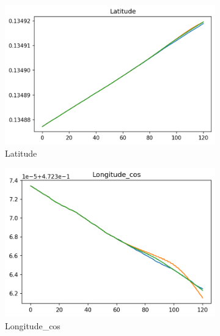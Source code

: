 \begin{figure}[ht]
     \centering
     \begin{subfigure}[b]{0.32\textwidth}
         \centering
         \includegraphics[width=\textwidth]{figures/prediction-plots-joint/Latitude.png}
         \caption{Latitude}
     \end{subfigure}
     \begin{subfigure}[b]{0.32\textwidth}
         \centering
         \includegraphics[width=\textwidth]{figures/prediction-plots-joint/Longitude_cos.png}
         \caption{Longitude\_cos}
     \end{subfigure}
     \begin{subfigure}[b]{0.32\textwidth}
         \centering

\end{subfigure}
\end{figure}
